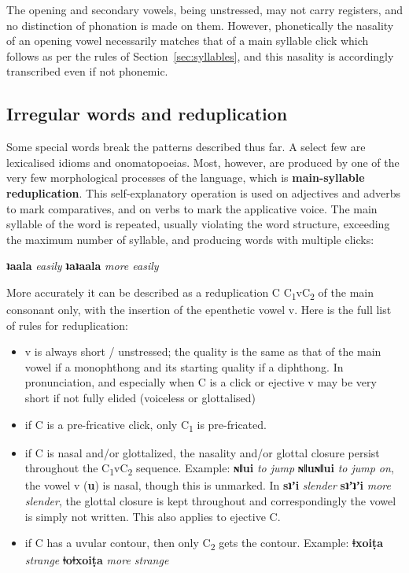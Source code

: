 \documentclass[11pt,a5paper]{book}
\newcommand{\qcn}[1]{\textcolor{AccentText}{\large\textbf{#1}}}
\newcommand{\transl}[2]{\qcn{#1} \emph{#2}}
\begin{document}
The opening and secondary vowels, being unstressed, may not carry registers, and no distinction of phonation is made on them. However, phonetically the nasality of an opening vowel necessarily matches that of a main syllable click which follows as per the rules of Section~\ref{sec:syllables}, and this nasality is accordingly transcribed even if not phonemic.

\subsection{Irregular words and reduplication}\label{sec:redup}

Some special words break the patterns described thus far. A select few are lexicalised idioms and onomatopoeias. Most, however, are produced by one of the very few morphological processes of the language, which is \textbf{main-syllable reduplication}. This self-explanatory operation is used on adjectives and adverbs to mark comparatives, and on verbs to mark the applicative voice. The main syllable of the word is repeated, usually violating the word structure, exceeding the maximum number of syllable, and producing words with multiple clicks:

\begin{center}
\transl{ʇaala}{easily} \textrightarrow \transl{ʇaʇaala}{more easily}
\end{center}

More accurately it can be described as a reduplication C \textrightarrow C\textsubscript{1}vC\textsubscript{2} of the main consonant only, with the insertion of the epenthetic vowel v. Here is the full list of rules for reduplication:

\begin{itemize}
	\item v is always short / unstressed; the quality is the same as that of the main vowel if a monophthong and its starting quality if a diphthong. In pronunciation, and especially when C is a click or ejective v may be very short if not fully elided (voiceless or glottalised)
	\item if C is a pre-fricative click, only C\textsubscript{1} is pre-fricated.
	\item if C is nasal and/or glottalized, the nasality and/or glottal closure persist throughout the C\textsubscript{1}vC\textsubscript{2} sequence. Example: \transl{ɴǁui}{to jump} \textrightarrow \transl{ɴǁuɴǁui}{to jump on}, the vowel v (\qcn{u}) is nasal, though this is unmarked. In \transl{sʇʼi}{slender} \textrightarrow \transl{sʇʼʇʼi}{more slender}, the glottal closure is kept throughout and correspondingly the vowel is simply not written. This also applies to ejective C.
	\item if C has a uvular contour, then only C\textsubscript{2} gets the contour. Example: \transl{ǂxoiṭa}{strange} \textrightarrow \transl{ǂoǂxoiṭa}{more strange}
\end{itemize}
\end{document}
